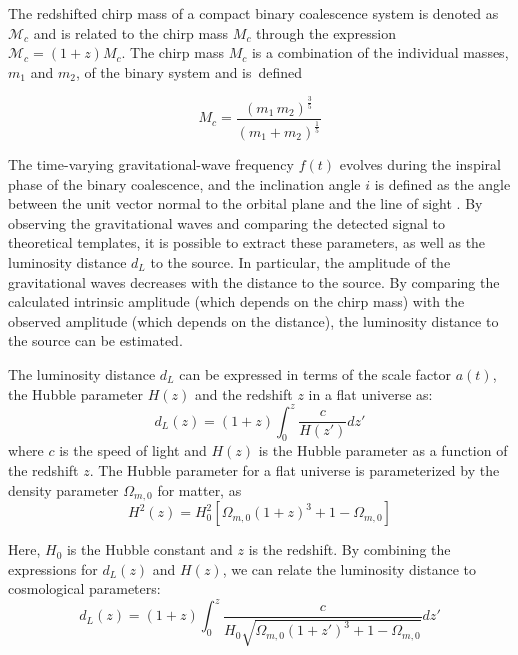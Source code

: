 \documentclass[universe,article,accept,moreauthors,pdftex]{Definitions/mdpi}
\newcommand{\be}{\begin{equation}}
\newcommand{\ee}{\end{equation}}
\begin{document}
The redshifted chirp mass of a compact binary coalescence system is denoted as $\mathcal{M}_c$ and is related to the chirp mass $M_c$ through the expression $\mathcal{M}_{c}=(1+z)M_{c}$. The chirp mass $M_c$ is a combination of the individual masses, $m_1$ and $m_2$, of the binary system and \mbox{is defined }

\begin{equation}
M_c = \frac{(m_1 \, m_2)^{\frac{3}{5}}}{(m_1 + m_2)^{\frac{1}{5}}}
\end{equation}

The time-varying gravitational-wave frequency $f(t)$ evolves during the inspiral phase of the binary coalescence, and the inclination angle $i$ is defined as the angle between the unit vector normal to the orbital plane and the line of sight \cite{10.1093/acprof:oso/9780198570745.001.0001, Belgacem_2019}. By observing the gravitational waves and comparing the detected signal to theoretical templates, it is possible to extract these parameters, as well as the luminosity distance $d_L$ to the source. In particular, the amplitude of the gravitational waves decreases with the distance to the source. By comparing the calculated intrinsic amplitude (which depends on the chirp mass) with the observed amplitude (which depends on the distance), the luminosity distance to the source can be estimated.

 
 












The luminosity distance $d_L$ can be expressed in terms of the scale factor $a(t)$, the Hubble parameter $H(z)$ and the redshift $z$ in a flat universe as:
\be
d_L(z) = (1 + z) \int_{0}^{z} \frac{c}{H(z')}  dz'
\ee
where $c$ is the speed of light and $H(z)$ is the Hubble parameter as a function of the redshift $z$. The Hubble parameter for a flat universe is parameterized by the density parameter $\Omega_{m,0}$ for matter, as
\be
H^2(z) = H_0^2 \left[ \Omega_{m,0} (1+z)^3 + 1-\Omega_{m,0}  \right]
\ee 

Here, $H_0$ is the Hubble constant and $z$ is the redshift. By combining the expressions for $d_L(z)$ and $H(z)$, we can relate the luminosity distance to cosmological parameters:
\be
d_L(z) = (1 + z) \int_{0}^{z} \frac{c}{H_0 \sqrt{\Omega_{m,0} (1+z')^3 + 1-\Omega_{m,0}}}  dz'
\ee
\end{document}
